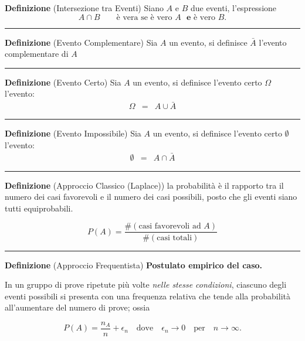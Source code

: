 \documentclass[
  11pt,
]{book}
\theoremstyle{mytheoremstyle}
\theoremstyle{mydefstyle}
\begin{document}
\textbf{Definizione} (Intersezione tra Eventi)
Siano \(A\) e \(B\) due eventi, l'espressione
\[
A\cap B\qquad\text{è vera se è vero $A$ }\textbf{e}\text{  è vero $B$.}
\]

\begin{center}\rule{0.5\linewidth}{0.5pt}\end{center}

\textbf{Definizione} (Evento Complementare)
Sia \(A\) un evento, si definisce \(\bar A\) l'evento complementare di \(A\)

\begin{center}\rule{0.5\linewidth}{0.5pt}\end{center}

\textbf{Definizione} (Evento Certo)
Sia \(A\) un evento, si definisce l'evento certo \(\Omega\) l'evento:
\begin{eqnarray*}
\Omega &=& A\cup\bar A
\end{eqnarray*}

\begin{center}\rule{0.5\linewidth}{0.5pt}\end{center}

\textbf{Definizione} (Evento Impossibile)
Sia \(A\) un evento, si definisce l'evento certo \(\emptyset\) l'evento:
\begin{eqnarray*}
\emptyset &=& A\cap\bar A
\end{eqnarray*}

\begin{center}\rule{0.5\linewidth}{0.5pt}\end{center}

\textbf{Definizione} (Approccio Classico (Laplace))
la probabilità è il rapporto tra il numero dei casi favorevoli e il
numero dei casi possibili, posto che gli eventi siano tutti
equiprobabili.

\[
P(A)=\frac{\#(\text{casi favorevoli ad $A$} )}{\#(\text{casi totali} )}
\]

\begin{center}\rule{0.5\linewidth}{0.5pt}\end{center}

\textbf{Definizione} (Approccio Frequentista)
\textbf{Postulato empirico del caso.}

In un gruppo di prove ripetute più volte \emph{nelle stesse condizioni},
ciascuno degli eventi possibili si presenta con una frequenza relativa
che tende alla probabilità all'aumentare del numero di prove; ossia

\[
P(A)=\frac{n_A}{n}+\epsilon_n
\quad\mbox{dove}\quad \epsilon_{n}\to 0 \quad\mbox{per}\quad n\to\infty.
\]
\end{document}
